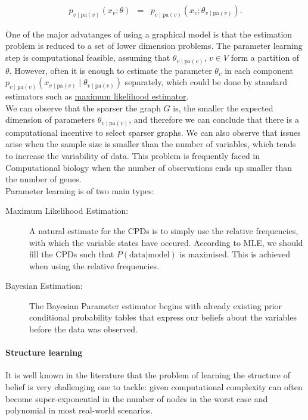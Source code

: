 \begin{eqnarray*}
p_{v\mid \text{pa}(v)}(x_{v};\theta) &=& p_{v\mid \text{pa}(v)}(x_v;\theta_{v\mid \text{pa}(v)}).
\end{eqnarray*}

One of the major advatanges of using a graphical model is that the estimation problem is reduced to a set of lower dimension problems. The parameter learning step is computational feasible, assuming that $\theta_{v\mid \text{pa}(v)}$, $v\in V$ form a partition of $\theta$.  However, often it is enough to estimate the parameter $\theta_v$ in each component $p_{v\mid \text{pa}(v)}(x_{v\mid \text{pa}(v)}\mid \theta_{v\mid \text{pa}(v)})$ separately, which could be done by standard estimators such as \hyperref[mle]{maximum likelihood estimator}.\\

We can observe that the sparser the graph $G$ is, the smaller the expected dimension of parameters $\theta_{v\mid \text{pa}(v)}$, and therefore we can conclude that there is a computational incentive to select sparser graphs. We can also observe that issues arise when the sample size is smaller than the number of variables, which tends to increase the variability of data. This problem is frequently faced in Computational biology when the number of observations ends up smaller than the number of genes.\\

Parameter learning is of two main types:

\begin{description}
		\item[Maximum Likelihood Estimation:]{\label{mlw} A natural estimate for the CPDs is to simply use the relative frequencies, with which the variable states have occured. According to MLE, we should fill the CPDs such that $P(\text{data}|\text{model})$ is maximised. This is achieved when using the relative frequencies\cite{875348}.}
		\item[Bayesian Estimation:]{The Bayesian Parameter estimator begins with already existing prior conditional probability tables that express our beliefs about the variables before the data was observed. }
\end{description}

\paragraph{Structure learning}
\label{structure}

It is well known in the literature that the problem of learning the structure of belief is very challenging one to tackle: given computational complexity can often become super-exponential in the number of nodes in the worst case and polynomial in most real-world scenarios.\\

